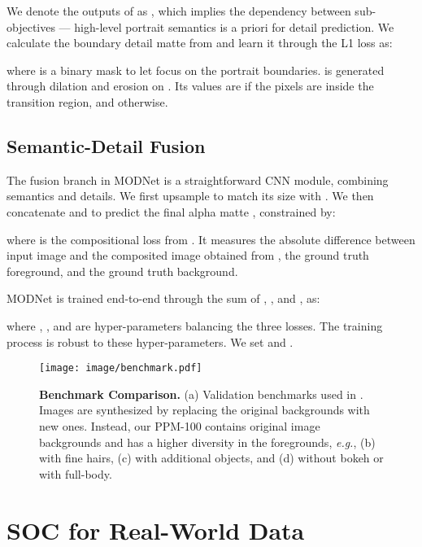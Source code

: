 \documentclass[letterpaper]{article} \usepackage{aaai22}  \usepackage{times}  \usepackage{helvet}  \usepackage{courier}  \usepackage[hyphens]{url}  \usepackage{graphicx} \urlstyle{rm} \def\UrlFont{\rm}  \usepackage{natbib}  \usepackage{caption} \usepackage{booktabs}
\begin{document}
We denote the outputs of  as , which implies the dependency between sub-objectives --- high-level portrait semantics  is a priori for detail prediction. We calculate the boundary detail matte  from  and learn it through the L1 loss as: 

where  is a binary mask to let  focus on the portrait boundaries.  is generated through dilation and erosion on . Its values are  if the pixels are inside the transition region, and  otherwise. 



\subsection{Semantic-Detail Fusion}\label{sec:3_4}
The fusion branch  in MODNet is a straightforward CNN module, combining semantics and details.
We first upsample  to match its size with . We then concatenate  and  to predict the final alpha matte , constrained by:

where  is the compositional loss from \cite{DIM}. 
It measures the absolute difference between input image  and the composited image obtained from , the ground truth foreground, and the ground truth background.

MODNet is trained end-to-end through the sum of , , and , as:

where , , and  are hyper-parameters balancing the three losses. The training process is robust to these hyper-parameters. We set  and . 



\begin{figure*}[ht]
\begin{center}
  \texttt{[image: image/benchmark.pdf]}
\end{center}
  \caption{\textbf{Benchmark Comparison.} 
   (a) Validation benchmarks used in \cite{SHM, BSHM, LFM}. Images are synthesized by replacing the original backgrounds with new ones. Instead, our PPM-100 contains original image backgrounds and has a higher diversity in the foregrounds, {\it e.g.}, (b) with fine hairs, (c) with additional objects, and (d) without bokeh or with full-body.
  }
\label{fig:benchmark}
\end{figure*}

\section{SOC for Real-World Data}\label{sec:soc}
\end{document}
